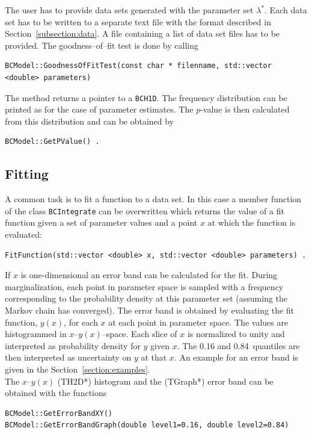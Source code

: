 \documentclass[11pt, a4paper]{article}
\begin{document}
\noindent 
The user has to provide data sets generated with the parameter set
$\lambda^{*}$. Each data set has to be written to a separate text file
with the format described in Section~\ref{subsection:data}. A file
containing a list of data set files has to be provided. The
goodness--of--fit test is done by calling
%
\begin{verbatim}
BCModel::GoodnessOfFitTest(const char * filenname, std::vector <double> parameters) 
\end{verbatim} 

\noindent 
The method returns a pointer to a \verb|BCH1D|. The frequency
distribution can be printed as for the case of parameter
estimates. The $p$-value is then calculated from this distribution and
can be obtained by 
%
\begin{verbatim}
BCModel::GetPValue() . 
\end{verbatim} 


\subsection{Fitting} 

A common task is to fit a function to a data set. In this case a member function of 
the class \verb|BCIntegrate| can be overwritten which returns the value of a fit function given 
a set of parameter values and a point $x$ at which the function is evaluated: 
%
\begin{verbatim}
FitFunction(std::vector <double> x, std::vector <double> parameters) . 
\end{verbatim}

\noindent 
If $x$ is one-dimensional an error band can be calculated for the fit. During 
marginalization, each point in parameter space is sampled with a frequency corresponding to the 
probability density at this parameter set (assuming the Markov chain has converged). The error band is obtained by 
evaluating the fit function, $y(x)$, for each $x$ at each point in parameter space. 
The values are histogrammed in $x$--$y(x)$--space. Each slice of $x$ is normalized to unity and interpreted as 
probability density for $y$ given $x$. The 0.16 and 0.84~quantiles are then interpreted as uncertainty on $y$ at that $x$. An example for an error band is given in the Section~\ref{section:examples}. \\ 

\noindent 
The $x$--$y(x)$ (TH2D*) histogram and the (TGraph*) error band can be obtained with the functions 
%
\begin{verbatim}
BCModel::GetErrorBandXY()
BCModel::GetErrorBandGraph(double level1=0.16, double level2=0.84) 
\end{verbatim}
\end{document}

